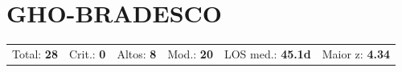 \documentclass[a4paper,10pt]{article}
\begin{document}
\newpage

\clearpage
\section{GHO-BRADESCO}
\begin{tcolorbox}[colback=lightblue,colframe=jcubeblue,title={\textbf{Resumo --- GHO-BRADESCO}}]
\begin{tabular}{ll@{\quad}ll@{\quad}ll}
Total: \textbf{28} &
Crit.: \textcolor{anomred}{\textbf{0}} &
Altos: \textcolor{anomorange}{\textbf{8}} &
Mod.: \textcolor{anomyellow}{\textbf{20}} &
LOS med.: \textbf{45.1d} &
Maior z: \textbf{4.34} \\


\end{tabular}
\end{tcolorbox}
\end{document}
